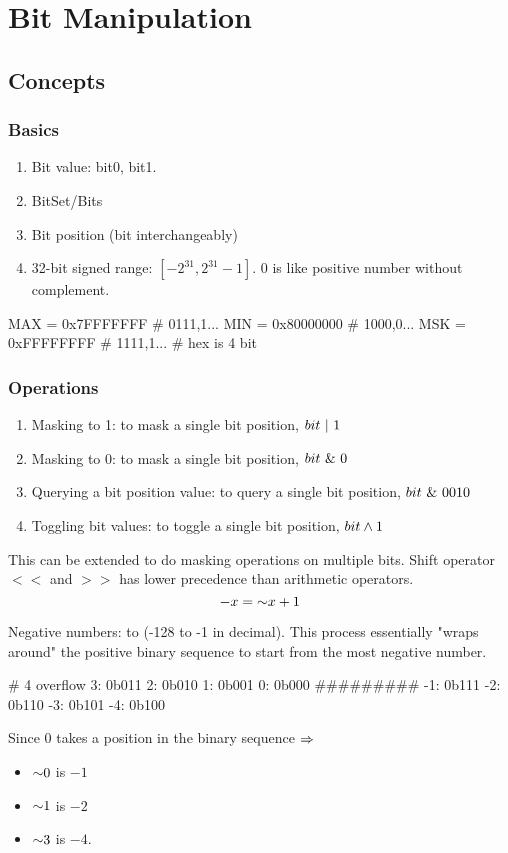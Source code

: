 \chapter{Bit Manipulation}
\section{Concepts}
\subsection{Basics}
\begin{enumerate}
\item Bit value: bit0, bit1. 
\item BitSet/Bits
\item Bit position (bit interchangeably)
\item 32-bit signed range: $[-2^{31}, 2^{31}-1]$. $0$ is like positive number without complement. 
\end{enumerate}
\begin{python}
MAX = 0x7FFFFFFF  # 0111,1...
MIN = 0x80000000  # 1000,0...
MSK = 0xFFFFFFFF  # 1111,1...
# hex is 4 bit
\end{python}
\subsection{Operations}
\begin{enumerate}
\item Masking to 1: to mask a single bit position, $bit\ |\  1$
\item Masking to 0: to mask a single bit position, $bit\ \&\  0$
\item Querying a bit position value: to query a single bit position, $bit\ \&\  0010$
\item Toggling bit values: to toggle a single bit position, $bit\wedge 1$
\end{enumerate}
This can be extended to do masking operations on multiple bits. 
Shift operator $<<$ and $>>$ has lower precedence than arithmetic operators.
$$
-x = \mathord{\sim} x+1
$$

Negative numbers:  to  (-128 to -1 in decimal). This process essentially "wraps around" the positive binary sequence to start from the most negative number. 

\begin{python}
 # 4 overflow
 3: 0b011
 2: 0b010
 1: 0b001
 0: 0b000
#########
-1: 0b111 
-2: 0b110
-3: 0b101
-4: 0b100
\end{python}
Since 0 takes a position in the binary sequence $\Rightarrow$
\begin{itemize}
\item $\mathord{\sim}0$ is $-1$
\item $\mathord{\sim}1$ is $-2$
\item $\mathord{\sim}3$ is $-4$.
\end{itemize}

